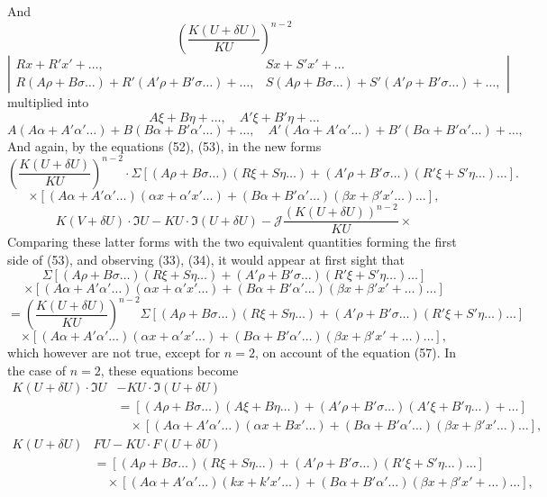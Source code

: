 \documentclass[11pt,a4paper]{article}
\theoremstyle{plain}
\theoremstyle{definition}
\theoremstyle{remark}
\begin{document}
And
\[
\left(\frac{K(U+\delta U)}{KU}\right)^{n-2}
\]
\[
\left|\begin{array}{cc}
Rx + R'x' + \ldots, & Sx + S'x' + \ldots \\
R(A\rho + B\sigma \ldots) + R'(A'\rho + B'\sigma \ldots) + \ldots, &
S(A\rho + B\sigma \ldots) + S'(A'\rho + B'\sigma \ldots) + \ldots,
\end{array}\right|
\]
multiplied into
\[
A\xi + B\eta + \ldots, \quad A'\xi + B'\eta + \ldots
\]
\[
A(A\alpha + A'\alpha' \ldots) + B(B\alpha + B'\alpha' \ldots) + \ldots, \quad
A'(A\alpha + A'\alpha' \ldots) + B'(B\alpha + B'\alpha' \ldots) + \ldots,
\]
And again, by the equations (52), (53), in the new forms
\[
\left(\frac{K(U+\delta U)}{KU}\right)^{n-2} \cdot
\Sigma[(A\rho + B\sigma \ldots)(R\xi + S\eta \ldots) + (A'\rho + B'\sigma \ldots)(R'\xi + S'\eta \ldots) \ldots]
\tag{65}.
\]
\[
\times [(A\alpha + A'\alpha' \ldots)(\alpha x + \alpha'x' \ldots) + (B\alpha + B'\alpha' \ldots)(\beta x + \beta'x' \ldots) \ldots]
\tag{66},
\]
\newpage
\[
K(V+\delta U) \cdot \mathfrak{I}U - KU \cdot \mathfrak{I}(U+\delta U)
-
\mathcal{J}\frac{(K(U+\delta U))^{n-2}}{KU} \times
\]
Comparing these latter forms with the two equivalent quantities forming the first side
of (53), and observing (33), (34), it would appear at first sight that
\[
\Sigma[(A\rho + B\sigma \ldots)(R\xi + S\eta \ldots) + (A'\rho + B'\sigma \ldots)(R'\xi + S'\eta \ldots) \ldots]
\]
\[
\times [(A\alpha + A'\alpha' \ldots)(\alpha x + \alpha'x' \ldots) + (B\alpha + B'\alpha' \ldots)(\beta x + \beta'x' + \ldots) \ldots]
\]
\[
= \left(\frac{K(U+\delta U)}{KU}\right)^{n-2} \Sigma[(A\rho + B\sigma \ldots)(R\xi + S\eta \ldots) + (A'\rho + B'\sigma \ldots)(R'\xi + S'\eta \ldots) \ldots]
\]
\[
\times [(A\alpha + A'\alpha' \ldots)(\alpha x + \alpha'x' \ldots) + (B\alpha + B'\alpha' \ldots)(\beta x + \beta'x' + \ldots) \ldots],
\]
which however are not true, except for $n = 2$, on account of the equation (57). In
the case of $n=2$, these equations become
\begin{align*}
K(U+\delta U) \cdot \mathfrak{I}U &- KU \cdot \mathfrak{I}(U+\delta U) \\
&= [(A\rho + B\sigma \ldots)(A\xi + B\eta \ldots) + (A'\rho + B'\sigma \ldots)(A'\xi + B'\eta \ldots) + \ldots] \\
&\quad \times [(A\alpha + A'\alpha' \ldots)(\alpha x + Bx' \ldots) + (B\alpha + B'\alpha' \ldots)(\beta x + \beta'x' \ldots) \ldots] \tag{68},
\end{align*}
\begin{align*}
K(U+\delta U) & FU - KU \cdot F(U+\delta U) \\
&= [(A\rho + B\sigma \ldots)(R\xi + S\eta \ldots) + (A'\rho + B'\sigma \ldots)(R'\xi + S'\eta \ldots) \ldots] \\
&\quad \times [(A\alpha + A'\alpha' \ldots)(kx + k'x' \ldots) + (B\alpha + B'\alpha' \ldots)(\beta x + \beta'x' + \ldots) \ldots] \tag{69},
\end{align*}
\end{document}
